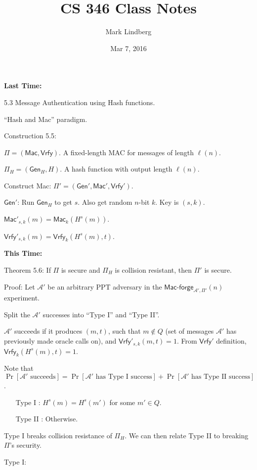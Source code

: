 \documentclass[12pt]{article}
\newcommand{\AAA}{\mathcal{A}}
\newcommand{\Mac}{\mathsf{Mac}}
\newcommand{\Macf}{\mathsf{Mac\text{-}forge}}
\newcommand{\Vrfy}{\mathsf{Vrfy}}
\newcommand{\Gen}{\mathsf{Gen}}
\begin{document}
\title{CS 346 Class Notes}
\date{Mar 7, 2016}
\author{Mark Lindberg}
\maketitle
\thispagestyle{fancy}

{\bf Last Time:}

5.3 Message Authentication using Hash functions.

``Hash and Mac'' paradigm.

Construction 5.5:

$\Pi=(\Mac,\Vrfy)$. A fixed-length MAC for messages of length $\ell(n)$.

$\Pi_H=(\Gen_H,H)$. A hash function with output length $\ell(n)$.

Construct Mac: $\Pi'=(\Gen',\Mac',\Vrfy')$.

$\Gen'$: Run $\Gen_H$ to get $s$. Also get random $n$-bit $k$. Key is $(s,k)$.

$\Mac'_{s,k}(m)=\Mac_k(H^s(m))$.

$\Vrfy'_{s,k}(m)=\Vrfy_k(H^s(m),t)$.

{\bf This Time:}

Theorem 5.6: If $\Pi$ is secure and $\Pi_H$ is collision resistant, then $\Pi'$ is secure.

Proof: Let $\AAA'$ be an arbitrary PPT adversary in the $\Macf_{\AAA',\Pi'}(n)$ experiment.

Split the $\AAA'$ successes into ``Type I'' and ``Type II''.

$\AAA'$ succeeds if it produces $(m,t)$, such that $m\not\in Q$ (set of messages $\AAA'$ has previously made oracle calls on), and $\Vrfy'_{s,k}(m,t)=1$. From $\Vrfy'$ definition, $\Vrfy_k(H^s(m),t)=1$.

Note that $\Pr[\AAA'\text{ succeeds}] = \Pr[\AAA'\text{ has Type I success}] + \Pr[\AAA'\text{ has Type II success}]$.

\begin{itemize}

\item[Type I]: $H^s(m)=H^s(m')$ for some $m'\in Q$.

\item[Type II]: Otherwise.

\end{itemize}

Type I breaks collision resistance of $\Pi_H$. We can then relate Type II to breaking $\Pi$'s security.

Type I:
\end{document}
